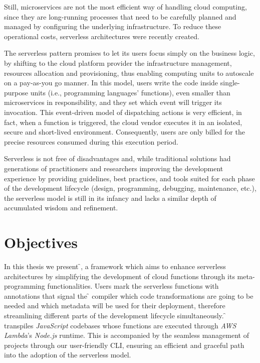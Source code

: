 Still, microservices are not the most efficient way of handling cloud computing,
since they are long-running processes that need to be carefully planned and managed
by configuring the underlying infrastructure. To reduce these operational costs,
serverless architectures were recently created.

The serverless pattern promises to let its users focus simply on the business logic,
by shifting to the cloud platform provider the infrastructure management,
resources allocation and provisioning, thus enabling computing units to autoscale on a pay-as-you go manner.
In this model, users write the code inside single-purpose units (i.e., programming languages' functions),
even smaller than microservices in responsibility,
and they set which event will trigger its invocation.
This event-driven model of dispatching actions is very efficient, in fact,
when a function is triggered, the cloud vendor executes it in an isolated, secure and short-lived environment.
Consequently, users are only billed for the precise resources consumed during this execution period.

Serverless is not free of disadvantages and, while traditional solutions
had generations of practitioners and researchers improving the development experience
by providing guidelines, best practices, and tools suited for each phase
of the development lifecycle (design, programming, debugging, maintenance, etc.),
the serverless model is still in its infancy and lacks a similar depth of accumulated wisdom and refinement.

\section{Objectives} %

In this thesis we present \f{}, a framework which aims to enhance serverless architectures
by simplifying the development of cloud functions through its meta-programming functionalities.
Users mark the serverless functions with annotations that signal the \f{} compiler
which code transformations are going to be needed and which metadata will be used
for their deployment, therefore streamlining different parts of the development lifecycle simultaneously.
\f{} transpiles \textit{JavaScript} codebases whose functions are executed
through \textit{AWS Lambda}'s \textit{Node.js} runtime.
This is accompanied by the seamless management of projects
through our user-friendly CLI, ensuring an efficient and graceful path
into the adoption of the serverless model.

